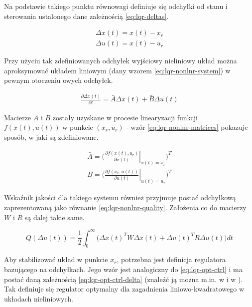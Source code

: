 Na podstawie takiego punktu równowagi definiuje się odchyłki od stanu i sterowania ustalonego dane zależnością \ref{eq:lqr-deltas}.

\begin{equation}\label{eq:lqr-deltas}
\begin{array}{lr}
    \Delta x(t) = x(t) - x_{r}\\
    \Delta u(t) = x(t) - u_{r}
\end{array}
\end{equation}

Przy użyciu tak zdefiniowanych odchyłek wyjściowy nieliniowy układ można aproksymować układem liniowym (dany wzorem \ref{eq:lqr-nonlnr-system}) w pewnym otoczeniu owych odchyłek.

\begin{equation}\label{eq:lqr-nonlnr-system}
\begin{array}{lr}
    \frac{\partial \Delta x(t)}{\partial t} = \bar{A}\Delta x(t) + \bar{B}\Delta u(t)
\end{array}
\end{equation}

Macierze $A$ i $B$ zostały uzyskane w procesie linearyzacji funkcji $f(x(t), u(t))$ w punkcie $(x_{r}, u_{r})$ - wzór \ref{eq:lqr-nonlnr-matrices} pokazuje sposób, w jaki są zdefiniowane.

\begin{equation}\label{eq:lqr-nonlnr-matrices}
\begin{array}{lr}
    \bar{A} = \bigg(\left. \frac{\partial f(x(t), u_{r})}{\partial x(t)}\right\vert_{x(t) = x_{r}}\bigg)^{T}\\
    \bar{B} = \bigg(\left. \frac{\partial f(x_{r}, u(t))}{\partial u(t)}\right\vert_{u(t) = u_{r}}\bigg)^{T}
\end{array}
\end{equation}

Wskaźnik jakości dla takiego systemu również przyjmuje postać odchyłkową zaprezentowaną jako równanie \ref{eq:lqr-nonlnr-quality}. Założenia co do macierzy $W$ i $R$ są dalej takie same.

\begin{equation}\label{eq:lqr-nonlnr-quality}
Q(\Delta u(t)) = \frac{1}{2}\int_{0}^{\infty} \Big( \Delta x(t)^{T}W\Delta x(t) + \Delta u(t)^{T}R\Delta u(t) \Big)dt
\end{equation}

Aby stabilizować układ w punkcie $x_{r}$, potrzebna jest definicja regulatora bazującego na odchyłkach.
Jego wzór jest analogiczny do \ref{eq:lqr-opt-ctrl} i ma postać daną zależnością \ref{eq:lqr-opt-ctrl-delta} (znaleźć ją można m.in. w \cite{Mitk2007} i w \cite{Korytowski2015}). Tak definiuje się regulator optymalny dla zagadnienia liniowo-kwadratowego w układach nieliniowych.

